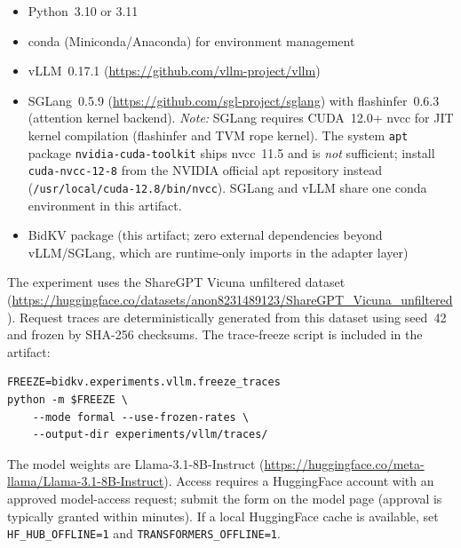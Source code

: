 \documentclass[conference]{IEEEtran}
\begin{document}

\begin{itemize}
  \item Python~3.10 or 3.11
  \item conda (Miniconda/Anaconda) for environment management
  \item vLLM~0.17.1 (\url{https://github.com/vllm-project/vllm})
  \item SGLang~0.5.9 (\url{https://github.com/sgl-project/sglang})
    with flashinfer~0.6.3 (attention kernel backend).
    \textit{Note:} SGLang requires CUDA~12.0+ nvcc for JIT kernel
    compilation (flashinfer and TVM rope kernel). The system
    \texttt{apt} package \texttt{nvidia-cuda-toolkit} ships nvcc~11.5
    and is \emph{not} sufficient; install \texttt{cuda-nvcc-12-8} from
    the NVIDIA official apt repository instead
    (\texttt{/usr/local/cuda-12.8/bin/nvcc}).
    SGLang and vLLM share one conda environment in this artifact.
  \item BidKV package (this artifact; zero external dependencies beyond
    vLLM/SGLang, which are runtime-only imports in the adapter layer)
\end{itemize}


The experiment uses the ShareGPT Vicuna unfiltered dataset
(\url{https://huggingface.co/datasets/anon8231489123/ShareGPT_Vicuna_unfiltered}).
Request traces are deterministically generated from this dataset using
seed~42 and frozen by SHA-256 checksums.
The trace-freeze script is included in the artifact:

\begin{Verbatim}
FREEZE=bidkv.experiments.vllm.freeze_traces
python -m $FREEZE \
    --mode formal --use-frozen-rates \
    --output-dir experiments/vllm/traces/
\end{Verbatim}


The model weights are Llama-3.1-8B-Instruct
(\url{https://huggingface.co/meta-llama/Llama-3.1-8B-Instruct}).
Access requires a HuggingFace account with an approved model-access
request; submit the form on the model page (approval is typically
granted within minutes).
If a local HuggingFace cache is available, set
\texttt{HF\_HUB\_OFFLINE=1} and \texttt{TRANSFORMERS\_OFFLINE=1}.

\artinpart{Installation and Deployment}
\end{document}
